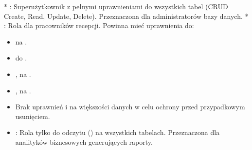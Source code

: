 \documentclass[letterpaper,10pt,polish]{sphinxmanual}
\begin{document}
\sphinxAtStartPar
{}
* : Superużytkownik z pełnymi uprawnieniami do wszystkich tabel (CRUD \sphinxhyphen{} Create, Read, Update, Delete). Przeznaczona dla administratorów bazy danych.
* : Rola dla pracowników recepcji. Powinna mieć uprawnienia do:
\begin{itemize}
\item {} 
\sphinxAtStartPar
{} na .

\item {} 
\sphinxAtStartPar
{} do .

\item {} 
\sphinxAtStartPar
{},  na .

\item {} 
\sphinxAtStartPar
{},  na .

\item {} 
\sphinxAtStartPar
Brak uprawnień  i  na większości danych w celu ochrony przed przypadkowym usunięciem.

\end{itemize}
\begin{itemize}
\item {} 
\sphinxAtStartPar
{}: Rola tylko do odczytu () na wszystkich tabelach. Przeznaczona dla analityków biznesowych generujących raporty.

\end{itemize}

\sphinxAtStartPar
{}
\end{document}
